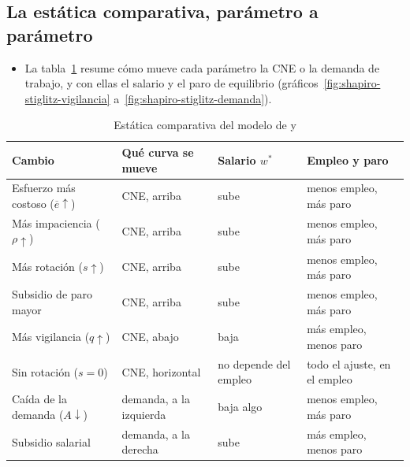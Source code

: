 \documentclass[11pt]{article}
\begin{document}
\subsection{La estática comparativa, parámetro a parámetro}\label{anexo:ss-estatica}

\begin{itemize}
\item La tabla~\ref{tab:ss-estatica} resume cómo mueve cada parámetro la CNE o la demanda de trabajo, y con ellas el salario y el paro de equilibrio (gráficos~\ref{fig:shapiro-stiglitz-vigilancia} a~\ref{fig:shapiro-stiglitz-demanda}).
\end{itemize}

\begin{table}[H]
\centering
\caption{Estática comparativa del modelo de  y }\label{tab:ss-estatica}
\small
\begin{tabular}{>{\raggedright\arraybackslash}m{4.4cm}>{\centering\arraybackslash}m{3.2cm}>{\centering\arraybackslash}m{2.2cm}>{\centering\arraybackslash}m{3.2cm}}
\toprule
\rowcolor{tceeazulpalido}\textbf{Cambio} & \textbf{Qué curva se mueve} & \textbf{Salario $w^*$} & \textbf{Empleo y paro}\\
\midrule
Esfuerzo más costoso ($\overline{e}\uparrow$) & CNE, arriba & \textcolor{tceerojo}{sube} & \textcolor{tceerojo}{menos empleo, más paro}\\
\addlinespace[0.3em]
Más impaciencia ($\rho\uparrow$) & CNE, arriba & \textcolor{tceerojo}{sube} & \textcolor{tceerojo}{menos empleo, más paro}\\
\addlinespace[0.3em]
Más rotación ($s\uparrow$) & CNE, arriba & \textcolor{tceerojo}{sube} & \textcolor{tceerojo}{menos empleo, más paro}\\
\addlinespace[0.3em]
Subsidio de paro mayor & CNE, arriba & \textcolor{tceerojo}{sube} & \textcolor{tceerojo}{menos empleo, más paro}\\
\addlinespace[0.3em]
Más vigilancia ($q\uparrow$) & CNE, abajo & \textcolor{tceeverde}{baja} & \textcolor{tceeverde}{más empleo, menos paro}\\
\addlinespace[0.3em]
Sin rotación ($s=0$) & CNE, horizontal & no depende del empleo & todo el ajuste, en el empleo\\
\addlinespace[0.3em]
Caída de la demanda ($A\downarrow$) & demanda, a la izquierda & \textcolor{tceerojo}{baja algo} & \textcolor{tceerojo}{menos empleo, más paro}\\
\addlinespace[0.3em]
Subsidio salarial & demanda, a la derecha & \textcolor{tceeverde}{sube} & \textcolor{tceeverde}{más empleo, menos paro}\\
\bottomrule
\end{tabular}
\end{table}
\end{document}
